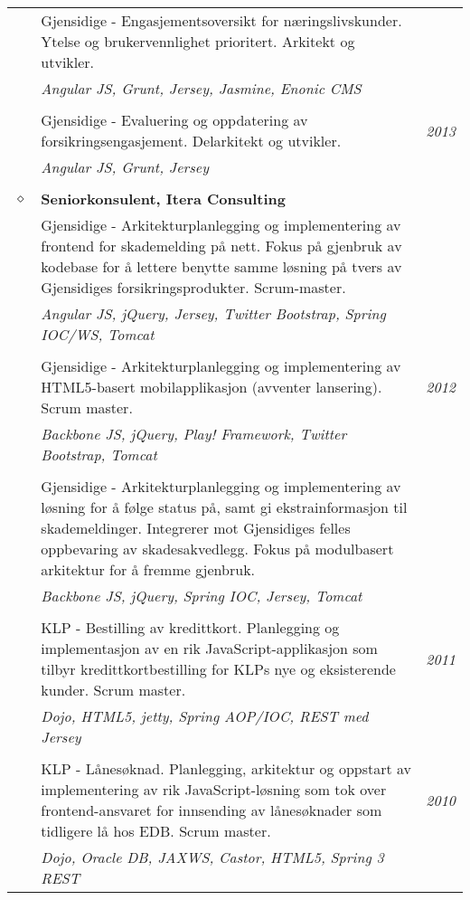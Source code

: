 \documentclass[overlapped,line,letterpaper]{res}
\begin{document}
\begin{resume}
\begin{tabularx}{\textwidth}{lXr}
& Gjensidige - Engasjementsoversikt for næringslivskunder. Ytelse og brukervennlighet
prioritert. Arkitekt og utvikler. & \\
& \small \textit{Angular JS, Grunt, Jersey, Jasmine, Enonic CMS} & \\
&& \\
& Gjensidige - Evaluering og oppdatering av forsikringsengasjement. Delarkitekt og utvikler. & \textit{2013} \\
& \small \textit{Angular JS, Grunt, Jersey} & \\
&& \\
$\diamond$	& \textbf{Seniorkonsulent, Itera Consulting} 	& \\
& Gjensidige - Arkitekturplanlegging og implementering av frontend for skademelding på nett. Fokus på gjenbruk av kodebase for å lettere benytte
samme løsning på tvers av Gjensidiges forsikringsprodukter. Scrum-master. & \\
& \small \textit{Angular JS, jQuery, Jersey, Twitter Bootstrap, Spring IOC/WS, Tomcat} & \\
&& \\
& Gjensidige - Arkitekturplanlegging og implementering av HTML5-basert mobilapplikasjon (avventer lansering). Scrum master.
& \textit{2012}\\
& \small \textit{Backbone JS, jQuery, Play! Framework, Twitter Bootstrap, Tomcat} & \\
&&\\
& Gjensidige - Arkitekturplanlegging og implementering av løsning for å følge status på,
samt gi ekstrainformasjon til skademeldinger. Integrerer mot
Gjensidiges felles oppbevaring av skadesakvedlegg. Fokus på modulbasert arkitektur for å fremme
gjenbruk.
& \\
& \small \textit{Backbone JS, jQuery, Spring IOC, Jersey, Tomcat} & \\
&&\\
& KLP - Bestilling av kredittkort. Planlegging og implementasjon av en rik
JavaScript-applikasjon som tilbyr kredittkortbestilling for 
KLPs nye og eksisterende kunder. Scrum master. & \textit{2011} \\
& \small \textit{Dojo, HTML5, jetty, Spring AOP/IOC, REST med Jersey} & \\
&&\\
& KLP - Lånesøknad. Planlegging, arkitektur og oppstart av implementering av rik
JavaScript-løsning som tok over frontend-ansvaret for innsending av
lånesøknader som tidligere lå hos EDB. Scrum master. & \textit{2010} \\
& \small \textit{Dojo, Oracle DB, JAXWS, Castor, HTML5, Spring 3 REST} & \\
\end{tabularx}


\end{resume}
\end{document}
